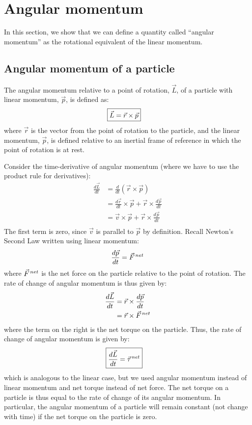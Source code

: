 \section{Angular momentum}
In this section, we show that we can define a quantity called ``angular momentum'' as the rotational equivalent of the linear momentum.
\subsection{Angular momentum of a particle}
The angular momentum relative to a point of rotation, $\vec L$, of a particle with linear momentum, $\vec p$, is defined as:
\begin{align}
\Aboxed{\vec L = \vec r\times \vec p}
\end{align}
where $\vec r$ is the vector from the point of rotation to the particle, and the linear momentum, $\vec p$, is defined relative to an inertial frame of reference in which the point of rotation is at rest.

Consider the time-derivative of angular momentum (where we have to use the product rule for derivatives):
\begin{align*}
\frac{d\vec L}{dt}  &= \frac{d}{dt} (\vec r\times \vec p)\\
&=\frac{d\vec r}{dt}\times \vec p + \vec r\times\frac{d\vec p}{dt}\\
&=\vec v\times \vec p + \vec r\times\frac{d\vec p}{dt}\\
\end{align*}
The first term is zero, since $\vec v$ is parallel to $\vec p$ by definition. Recall Newton's Second Law written using linear momentum:
\begin{align*}
\frac{d\vec p}{dt} = \pvec F^{net}
\end{align*}
where $\pvec F^{net}$ is the net force on the particle relative to the point of rotation. The rate of change of angular momentum is thus given by:
\begin{align*}
\frac{d\vec L }{dt} &= \vec r\times\frac{d\vec p}{dt}\\
&=\vec r\times\pvec F^{net}
\end{align*}
where the term on the right is the net torque on the particle. Thus, the rate of change of angular momentum is given by:
\begin{align}
\Aboxed{\frac{d\vec L}{dt}   = \pvec \tau^{net}}
\end{align}
which is analogous to the linear case, but we used angular momentum instead of linear momentum and net torque instead of net force. The net torque on a particle is thus equal to the rate of change of its angular momentum. In particular, the angular momentum of a particle will remain constant (not change with time) if the net torque on the particle is zero. 

